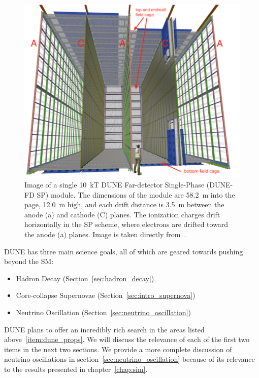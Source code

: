 \begin{figure}[]
\centering
\includegraphics[width=\textwidth]{images/dune_fd_10ktmodule_tdrv1.png}
\caption{Image of a single 10~\unit{kT} DUNE Far-detector Single-Phase (DUNE-FD SP) module.
The dimensions of the module are 58.2~\unit{m} into the page, 12.0~\unit{m} high, and each drift distance is 3.5~\unit{m} between the anode (a) and cathode (C) planes. 
The ionization charges drift horizontally in the SP scheme, where electrons are drifted toward the anode (a) planes.
Image is taken directly from~\citep{DUNE_TDR_V1_Abi_2020}.
}
\label{fig:dune_10kt}
\end{figure}


DUNE has three main science goals, all of which are geared towards pushing beyond the SM:
\begin{itemize}
    \item Hadron Decay (Section~\ref{sec:hadron_decay})
    \item Core-collapse Supernovae (Section~\ref{sec:intro_supernova})
    \item Neutrino Oscillation (Section~\ref{sec:neutrino_oscillation})
\label{item:dune_props}
\end{itemize}

DUNE plans to offer an incredibly rich search in the areas listed above~\ref{item:dune_props}.
We will discuss the relevance of each of the first two items in the next two sections.
We provide a more complete discussion of neutrino oscillations in section~\ref{sec:neutrino_oscillation} because of its relevance to the results presented in chapter~\ref{chap:sim}.


